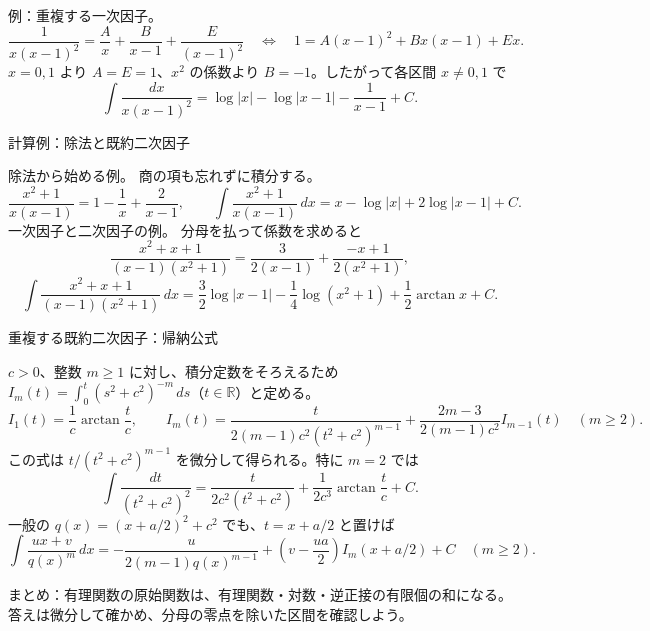 \documentclass[a4paper,10pt,pdflatex,ja=standard,jafont=ipaex-type1,
  magstyle=real,scale=1]{bxjsarticle}
\newcommand{\topic}[1]{\par\vspace{5pt}%
  {\large\sffamily\mdseries\color{accent}#1}\par\vspace{2pt}}
\newcommand{\keybox}[1]{\par\vspace{3pt}\begingroup
  \setlength{\fboxsep}{4pt}%
  \colorbox{soft}{\parbox{\dimexpr\linewidth-2\fboxsep\relax}{\small #1}}%
  \endgroup\par\vspace{2pt}}
\newcommand{\examplelabel}[1]{{\sffamily\mdseries\color{ink}#1}}
\begin{document}
\examplelabel{例：重複する一次因子。}
$$
 \frac1{x(x-1)^2}=\frac A x+\frac B{x-1}+\frac E{(x-1)^2}
 \quad\Longleftrightarrow\quad
 1=A(x-1)^2+Bx(x-1)+Ex.
$$
$x=0,1$ より $A=E=1$、$x^2$ の係数より $B=-1$。したがって各区間 $x\ne0,1$ で
$$
 \int\frac{dx}{x(x-1)^2}=\log|x|-\log|x-1|-\frac1{x-1}+C.
$$

\newpage
\noindent\begin{minipage}[b][\dimexpr0.5\textheight-\parskip\relax][t]{\linewidth}
\topic{計算例：除法と既約二次因子}
\examplelabel{除法から始める例。}
商の項も忘れずに積分する。
$$
 \frac{x^2+1}{x(x-1)}=1-\frac1x+\frac2{x-1},\qquad
 \int\frac{x^2+1}{x(x-1)}\,dx=x-\log|x|+2\log|x-1|+C.
$$
\examplelabel{一次因子と二次因子の例。}
分母を払って係数を求めると
$$
 \frac{x^2+x+1}{(x-1)(x^2+1)}
 =\frac{3}{2(x-1)}+\frac{-x+1}{2(x^2+1)},
$$
$$
 \int\frac{x^2+x+1}{(x-1)(x^2+1)}\,dx
 =\frac32\log|x-1|-\frac14\log(x^2+1)+\frac12\arctan x+C.
$$

\topic{重複する既約二次因子：帰納公式}
$c>0$、整数 $m\ge1$ に対し、積分定数をそろえるため
$I_m(t)=\int_0^t(s^2+c^2)^{-m}\,ds$（$t\in\mathbb R$）と定める。
$$
 I_1(t)=\frac1c\arctan\frac t c,\qquad
 I_m(t)=\frac{t}{2(m-1)c^2(t^2+c^2)^{m-1}}
       +\frac{2m-3}{2(m-1)c^2}I_{m-1}(t)\quad(m\ge2).
$$
この式は $t/(t^2+c^2)^{m-1}$ を微分して得られる。特に $m=2$ では
$$
 \int\frac{dt}{(t^2+c^2)^2}
 =\frac{t}{2c^2(t^2+c^2)}+\frac1{2c^3}\arctan\frac t c+C.
$$
一般の $q(x)=(x+a/2)^2+c^2$ でも、$t=x+a/2$ と置けば
$$
 \int\frac{ux+v}{q(x)^m}\,dx
 =-\frac{u}{2(m-1)q(x)^{m-1}}
  +\left(v-\frac{ua}{2}\right)I_m(x+a/2)+C\quad(m\ge2).
$$
\keybox{まとめ：有理関数の原始関数は、有理関数・対数・逆正接の有限個の和になる。
答えは微分して確かめ、分母の零点を除いた区間を確認しよう。}
\end{minipage}\par\nointerlineskip
\end{document}

